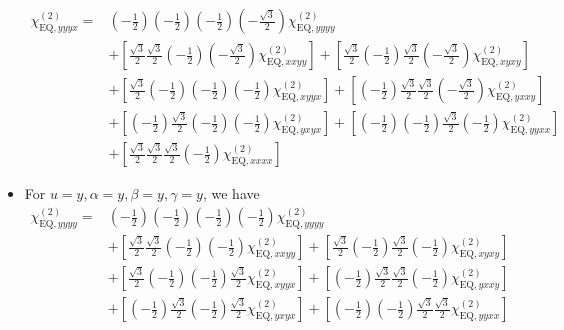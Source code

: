 \documentclass[UTF8,10pt,a4paper]{article}
\begin{document}
\begin{itemize}
\begin{align}
\nonumber\chi_{\text{EQ},yyyx}^{(2)}=&\left(-\frac{1}{2}\right)\left(-\frac{1}{2}\right)\left(-\frac{1}{2}\right)\left(-\frac{\sqrt{3}}{2}\right)\chi_{\text{EQ},yyyy}^{(2)}\\
\nonumber&+\left[\frac{\sqrt{3}}{2}\frac{\sqrt{3}}{2}\left(-\frac{1}{2}\right)\left(-\frac{\sqrt{3}}{2}\right)\chi_{\text{EQ},xxyy}^{(2)}\right]+\left[\frac{\sqrt{3}}{2}\left(-\frac{1}{2}\right)\frac{\sqrt{3}}{2}\left(-\frac{\sqrt{3}}{2}\right)\chi_{\text{EQ},xyxy}^{(2)}\right]\\
\nonumber&+\left[\frac{\sqrt{3}}{2}\left(-\frac{1}{2}\right)\left(-\frac{1}{2}\right)\left(-\frac{1}{2}\right)\chi_{\text{EQ},xyyx}^{(2)}\right]+\left[\left(-\frac{1}{2}\right)\frac{\sqrt{3}}{2}\frac{\sqrt{3}}{2}\left(-\frac{\sqrt{3}}{2}\right)\chi_{\text{EQ},yxxy}^{(2)}\right]\\
\nonumber&+\left[\left(-\frac{1}{2}\right)\frac{\sqrt{3}}{2}\left(-\frac{1}{2}\right)\left(-\frac{1}{2}\right)\chi_{\text{EQ},yxyx}^{(2)}\right]+\left[\left(-\frac{1}{2}\right)\left(-\frac{1}{2}\right)\frac{\sqrt{3}}{2}\left(-\frac{1}{2}\right)\chi_{\text{EQ},yyxx}^{(2)}\right]\\
&+\left[\frac{\sqrt{3}}{2}\frac{\sqrt{3}}{2}\frac{\sqrt{3}}{2}\left(-\frac{1}{2}\right)\chi_{\text{EQ},xxxx}^{(2)}\right]
\end{align}\normalsize
\item For $u=y,\alpha=y,\beta=y,\gamma=y$, we have
\footnotesize\begin{align}
\nonumber\chi_{\text{EQ},yyyy}^{(2)}=&\left(-\frac{1}{2}\right)\left(-\frac{1}{2}\right)\left(-\frac{1}{2}\right)\left(-\frac{1}{2}\right)\chi_{\text{EQ},yyyy}^{(2)}\\
\nonumber&+\left[\frac{\sqrt{3}}{2}\frac{\sqrt{3}}{2}\left(-\frac{1}{2}\right)\left(-\frac{1}{2}\right)\chi_{\text{EQ},xxyy}^{(2)}\right]+\left[\frac{\sqrt{3}}{2}\left(-\frac{1}{2}\right)\frac{\sqrt{3}}{2}\left(-\frac{1}{2}\right)\chi_{\text{EQ},xyxy}^{(2)}\right]\\
\nonumber&+\left[\frac{\sqrt{3}}{2}\left(-\frac{1}{2}\right)\left(-\frac{1}{2}\right)\frac{\sqrt{3}}{2}\chi_{\text{EQ},xyyx}^{(2)}\right]+\left[\left(-\frac{1}{2}\right)\frac{\sqrt{3}}{2}\frac{\sqrt{3}}{2}\left(-\frac{1}{2}\right)\chi_{\text{EQ},yxxy}^{(2)}\right]\\
\nonumber&+\left[\left(-\frac{1}{2}\right)\frac{\sqrt{3}}{2}\left(-\frac{1}{2}\right)\frac{\sqrt{3}}{2}\chi_{\text{EQ},yxyx}^{(2)}\right]+\left[\left(-\frac{1}{2}\right)\left(-\frac{1}{2}\right)\frac{\sqrt{3}}{2}\frac{\sqrt{3}}{2}\chi_{\text{EQ},yyxx}^{(2)}\right]\\

\end{align}
\end{itemize}
\end{document}
